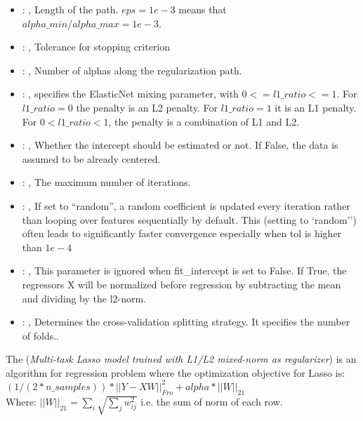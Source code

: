 \begin{itemize}
    \item {}: , 
      Length of the path. $eps=1e-3$ means that $alpha\_min / alpha\_max = 1e-3$.

    \item {}: , 
      Tolerance for stopping criterion

    \item {}: , 
      Number of alphas along the regularization path.

    \item {}: , 
      specifies the                                                  ElasticNet mixing parameter,
      with $0 <= l1\_ratio <= 1$.                                                  For $l1\_ratio =
      0$ the penalty is an L2 penalty.                                                  For
      $l1\_ratio = 1$ it is an L1 penalty.                                                  For $0 <
      l1\_ratio < 1$, the penalty is a combination of L1 and L2.

    \item {}: , 
      Whether the intercept should be estimated or not. If False,
      the data is assumed to be already centered.

    \item {}: , 
      The maximum number of iterations.

    \item {}: , 
      If set to ``random'', a random coefficient is updated every iteration
      rather than looping over features sequentially by default. This (setting to `random'')
      often leads to significantly faster convergence especially when tol is higher than $1e-4$

    \item {}: , 
      This parameter is ignored when fit\_intercept is set to False. If True,
      the regressors X will be normalized before regression by subtracting the mean and
      dividing by the l2-norm.

    \item {}: , 
      Determines the cross-validation splitting strategy.
      It specifies the number of folds..
  \end{itemize}
 The  (\textit{Multi-task Lasso model trained                         with
 L1/L2 mixed-norm as regularizer}) is an algorithm for regression problem
 where the optimization objective for Lasso is:                         $(1 / (2 * n\_samples)) *
 ||Y - XW||^2_{Fro} + alpha * ||W||_{21}$                         \\Where:
 $||W||_{21} = \sum_i \sqrt{\sum_j w_{ij}^2}$                         i.e. the sum of norm of each
 row.                         

